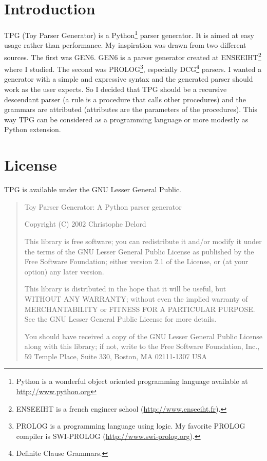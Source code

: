 \section{Introduction}

TPG (Toy Parser Generator) is a Python\footnote{Python is a wonderful object oriented programming language available at \url{http://www.python.org}} parser generator.
It is aimed at easy usage rather than performance.
My inspiration was drawn from two different sources.
The first was GEN6. GEN6 is a parser generator created at ENSEEIHT\footnote{ENSEEIHT is a french engineer school (\url{http://www.enseeiht.fr}).} where I studied.
The second was PROLOG\footnote{PROLOG is a programming language using logic. My favorite PROLOG compiler is SWI-PROLOG (\url{http://www.swi-prolog.org}).}, especially DCG\footnote{Definite Clause Grammars.} parsers.
I wanted a generator with a simple and expressive syntax and the generated parser should work as the user expects. So I decided that TPG should be a recursive descendant parser (a rule is a procedure that calls other procedures) and the grammars are attributed (attributes are the parameters of the procedures).
This way TPG can be considered as a programming language or more modestly as Python extension.

\section{License}

TPG is available under the GNU Lesser General Public.

\begin{quote}
Toy Parser Generator: A Python parser generator

Copyright (C) 2002 Christophe Delord
 
This library is free software; you can redistribute it and/or
modify it under the terms of the GNU Lesser General Public
License as published by the Free Software Foundation; either
version 2.1 of the License, or (at your option) any later version.

This library is distributed in the hope that it will be useful,
but WITHOUT ANY WARRANTY; without even the implied warranty of
MERCHANTABILITY or FITNESS FOR A PARTICULAR PURPOSE.  See the GNU
Lesser General Public License for more details.

You should have received a copy of the GNU Lesser General Public
License along with this library; if not, write to the Free Software
Foundation, Inc., 59 Temple Place, Suite 330, Boston, MA  02111-1307  USA 
\end{quote}

